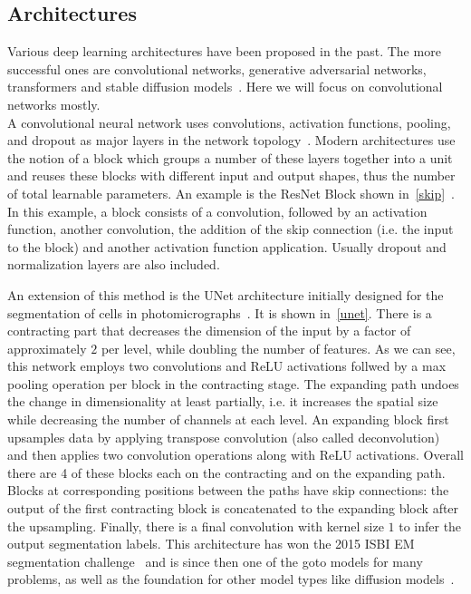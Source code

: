 \subsection{Architectures}
Various deep learning architectures have been proposed in the past.
The more successful ones are convolutional networks, generative adversarial networks, transformers and stable diffusion models~\autocite{vaswani_attention_2017, goodfellow_generative_2020, krizhevsky_imagenet_2012, sohl-dickstein_deep_2015, lecun_handwritten_1989}.
Here we will focus on convolutional networks mostly. \\

A convolutional neural network uses convolutions, activation functions, pooling, and dropout as major layers in the network topology~\autocite{goodfellow_deep_2016}.
Modern architectures use the notion of a block which groups a number of these layers together into a unit and reuses these blocks with different input and output shapes, thus the number of total learnable parameters.
An example is the ResNet Block shown in~\ref{skip}~\autocite{he_deep_2016}.
In this example, a block consists of a convolution, followed by an activation function, another convolution, the addition of the skip connection (i.e. the input to the block) and another activation function application.
Usually dropout and normalization layers are also included. \\

An extension of this method is the UNet architecture initially designed for the segmentation of cells in photomicrographs~\autocite{ronneberger_u-net_2015}.
It is shown in~\ref{unet}.
There is a contracting part that decreases the dimension of the input by a factor of approximately $2$ per level, while doubling the number of features.
As we can see, this network employs two convolutions and ReLU activations follwed by a max pooling operation per block in the contracting stage.
The expanding path undoes the change in dimensionality at least partially, i.e. it increases the spatial size while decreasing the number of channels at each level.
An expanding block first upsamples data by applying transpose convolution (also called deconvolution) and then applies two convolution operations along with ReLU activations.
Overall there are 4 of these blocks each on the contracting and on the expanding path.
Blocks at corresponding positions between the paths have skip connections: the output of the first contracting block is concatenated to the expanding block after the upsampling.
Finally, there is a final convolution with kernel size $1$ to infer the output segmentation labels.
This architecture has won the 2015 ISBI EM segmentation challenge~\autocite{noauthor_segmentation_nodate} and is since then one of the goto models for many problems, as well as the foundation for other model types like diffusion models~\autocite{rombach_high-resolution_2022}.


